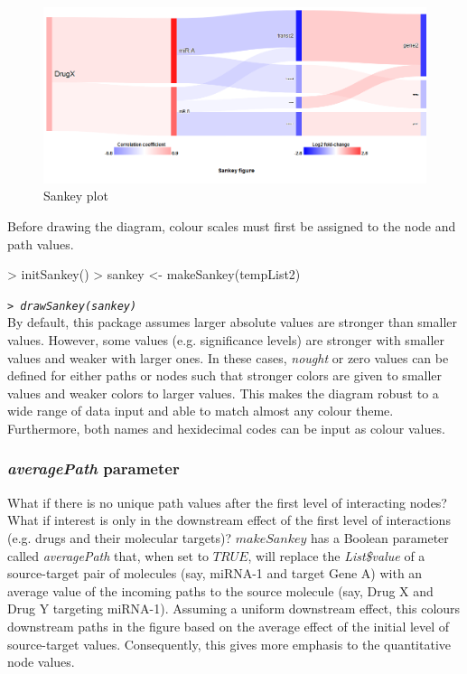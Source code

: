 \documentclass[a4paper]{article}
\begin{document}
\begin{figure}[htbp]
    \begin{center}
    \includegraphics[width=\textwidth]{figure1.png}
    \caption{Sankey plot}
    \end{center}
\end{figure}

Before drawing the diagram, colour scales  must first be assigned to the node and path values.
\begin{Schunk}
\begin{Sinput}
> initSankey()
> sankey <- makeSankey(tempList2)
\end{Sinput}
\end{Schunk}
\textit{\texttt{> drawSankey(sankey)}}\\


By default, this package assumes larger absolute values are stronger than smaller values. However, some values (e.g. significance levels)  are stronger with smaller values and weaker with larger ones. In these cases, \textit{nought} or zero values can be defined for either paths or nodes such that stronger colors are given to smaller values and weaker colors to larger values. This makes the diagram robust to a wide range of data input and able to match almost any colour theme. Furthermore, both names and hexidecimal codes can be input as colour values.

    \subsubsection{\textit{averagePath} parameter}
What if there is no unique path values after the first level of interacting nodes? What if interest is only in the downstream effect of the first level of interactions (e.g. drugs and their molecular targets)? $makeSankey$ has a Boolean parameter called \textit{averagePath} that, when set to $TRUE$, will replace the \textit{List\$value} of a source-target pair of molecules (say, miRNA-1 and target Gene A) with an average value of the incoming paths to the source molecule (say, Drug X and Drug Y targeting miRNA-1). Assuming a uniform downstream effect, this colours downstream paths in the figure based on the average effect of the initial level of source-target values. Consequently, this gives more emphasis to the quantitative node values.
\end{document}
